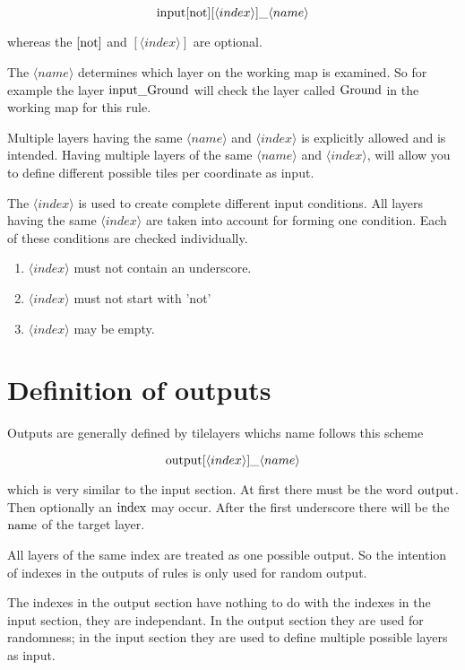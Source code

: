 \documentclass[dvips, a4paper, 12pt,listof=totoc, oneside, parskip]{scrbook}
\begin{document}
$$\textup{input}[\textup{not}] [\langle index \rangle]  \_ \langle name \rangle$$

whereas the $[\textup{not}]$ and $[\langle index \rangle]$ are optional.

The $\langle name \rangle$ determines which layer on the working map is examined.
So for example the layer $\textup{input}\_\textup{Ground}$ will check the
layer called $\textup{Ground}$ in the working map for this rule.

Multiple layers having the same $\langle name \rangle$ and $\langle index \rangle$
is explicitly allowed and is intended. Having multiple layers of the same
$\langle name \rangle$ and $\langle index \rangle$, will allow you to define different possible tiles
per coordinate as input.

The $\langle index \rangle$ is used to create complete different input conditions.
All layers having the same $\langle index \rangle$ are taken into account for forming one
condition. Each of these conditions are checked individually.

\begin{enumerate}
  \item $\langle index \rangle$ must not contain an underscore.
  \item $\langle index \rangle$ must not start with 'not'
  \item $\langle index \rangle$ may be empty.
\end{enumerate}






\section{Definition of outputs}

Outputs are generally defined by tilelayers whichs name follows this scheme

$$\textup{output}[\langle index \rangle]  \_ \langle name \rangle$$

which is very similar to the input section. At first there must be the word $\textup{output}$.
Then optionally an $\textup{index}$ may occur. After the first underscore there will be the
$\textup{name}$ of the target layer.

All layers of the same index are treated as one possible output.
So the intention of indexes in the outputs of rules is only used for random
output.

The indexes in the output section have nothing to do with the indexes in the input section,
they are independant. In the output section they are used for randomness; in the input section
they are used to define multiple possible layers as input.
\end{document}
